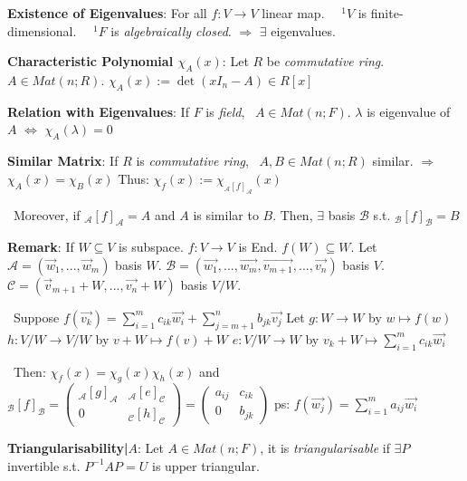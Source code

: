 \documentclass[9pt]{article}
\begin{document}
\textbf{Existence of Eigenvalues}: For all $f:V\to V$ linear map. \ \ $^1V$ is finite-dimensional. \ \ $^1F$ is \textit{algebraically closed}. \quad $\Rightarrow$ \quad $\exists$ eigenvalues.

\textbf{Characteristic Polynomial $\chi_A(x)$}: Let $R$ be \textit{commutative ring}. $A\in Mat(n;R)$. \quad $\chi_A(x):=\det(xI_n-A)\in R[x]$

\quad \textbf{Relation with Eigenvalues}: If $F$ is \textit{field}, \ $A\in Mat(n;F)$. \quad $\lambda$ is eigenvalue of $A$ $\Leftrightarrow$ $\chi_A(\lambda)=0$

\quad \textbf{Similar Matrix}: If $R$ is \textit{commutative ring}, \ $A,B\in Mat(n;R)$ similar. \quad $\Rightarrow$ \quad $\chi_A(x)=\chi_B(x)$ \qquad Thus: $\chi_f(x):=\chi_{_{\mathcal{A}}[f]_{\mathcal{A}}}(x)$

\qquad \qquad \qquad \qquad \ Moreover, if $_{\mathcal{A}}[f]_{\mathcal{A}}=A$ and $A$ is similar to $B$. \quad Then, $\exists$ basis $\mathcal{B}$ s.t. $_{\mathcal{B}}[f]_{\mathcal{B}}=B$

\quad \textbf{Remark}: {\scriptsize If $W\subseteq V$ is subspace. $f:V\to V$  is End. $f(W)\subseteq W$. \quad Let $\mathcal{A}=(\vec{w}_1,...,\vec{w}_m)$ basis $W$. \quad $\mathcal{B}=(\vec{w_1},...,\vec{w_m},\vec{v_{m+1}},...,\vec{v_n})$ basis $V$. \quad $\mathcal{C}=(\vec{v}_{m+1}+W,...,\vec{v_n}+W)$ basis $V/W$.}

\qquad \qquad \quad \ {\scriptsize Suppose $f(\vec{v_k})=\sum_{i=1}^m c_{ik}\vec{w_i}+\sum_{j=m+1}^n b_{jk}\vec{v_j}$ \quad  Let $g:W\to W$ by $w\mapsto f(w)$ \quad $h:V/W\to V/W$ by $v+W\mapsto f(v)+W$ \quad $e:V/W\to W$ by $v_k + W\mapsto \sum_{i=1}^m c_{ik}\vec{w_i}$}

\qquad \qquad \quad \ {\scriptsize Then: \quad $\chi_{f}(x)=\chi_{g}(x)\chi_h(x)$ \quad and \quad $_{\mathcal{B}}[f]_{\mathcal{B}}=\begin{pmatrix} _{\mathcal{A}}[g]_{\mathcal{A}} & _{\mathcal{A}}[e]_{\mathcal{C}} \\ 0 & _{\mathcal{C}}[h]_{\mathcal{C}} \end{pmatrix}= \begin{pmatrix} a_{ij} & c_{ik} \\ 0 & b_{jk} \end{pmatrix}$ \qquad ps: $f(\vec{w_j})=\sum_{i=1}^m a_{ij}\vec{w_i}$}

\textbf{Triangularisability|$A$}: Let $A\in Mat(n;F)$, it is \textit{triangularisable} if $\exists P$ invertible s.t. $P^{-1}AP=U$ is upper triangular.
\end{document}
